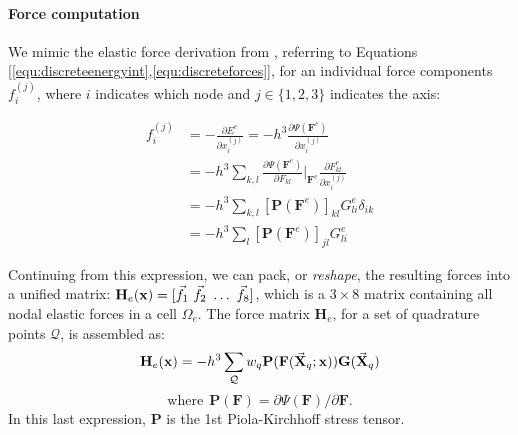 \paragraph{Force computation} We mimic the elastic force derivation
from \cite{McAdaZSETTS:2011},
referring to Equations [\ref{equ:discreteenergyint},\ref{equ:discreteforces}], for an individual force components
$f_i^{(j)}$, where $i$ indicates which node and $j \in \{1,2,3\}$
indicates the axis:

\begin{equation}
  \begin{split}
    f_i^{(j)} &= -\frac{\partial E^e}{\partial x^{(j)}_i} =
    -h^3\frac{\partial \Psi(\bm F^e) }{\partial x^{(j)}_i} \\ &=
    -h^3\sum_{k,l}\frac{\partial \Psi(\bm F^e) }{\partial F_{kl}}\bigg|_{\bm F^e}
    \frac{\partial F^e_{kl} }{\partial x^{(j)}_i} \\
    & = -h^3\sum_{k,l}[\bm P(\bm F^e)]_{kl}G^e_{li}\delta_{ik}\\ &=
    -h^3\sum_{l}[\bm P(\bm F^e)]_{jl}G^e_{li}
  \end{split}
\end{equation}


Continuing from this expression, we can pack, or \textit{reshape}, the
resulting forces into a unified matrix:
$\mathbf{H}_e(\bvec{\mathbf x})=[\vec{f}_1\ \vec{f}_2\ \hdots\
\vec{f}_8]$, which is a $3\times 8$ matrix containing all nodal elastic forces in a
cell $\Omega_e$. The force matrix $\mathbf{H}_e$, for a set of
quadrature points $\mathcal Q$, is assembled as:
\begin{equation}
\mathbf{H}_e(\hbox{\boldmath $\mathbf x$})=-h^3 \sum_{\mathcal Q} w_q\mathbf{P}(\mathbf{F}(\vec{\mathbf X}_q;\hbox{\boldmath $\mathbf x$}))\mathbf{G}(\vec{\mathbf X}_q)
\end{equation}
$$
\mbox{where}\ \
\mbox{$\mathbf{P}(\mathbf{F})=\partial\Psi(\mathbf{F})/\partial\mathbf{F}$}.
$$
In this last expression, $\mathbf{P}$ is the 1st
Piola-Kirchhoff stress tensor.

